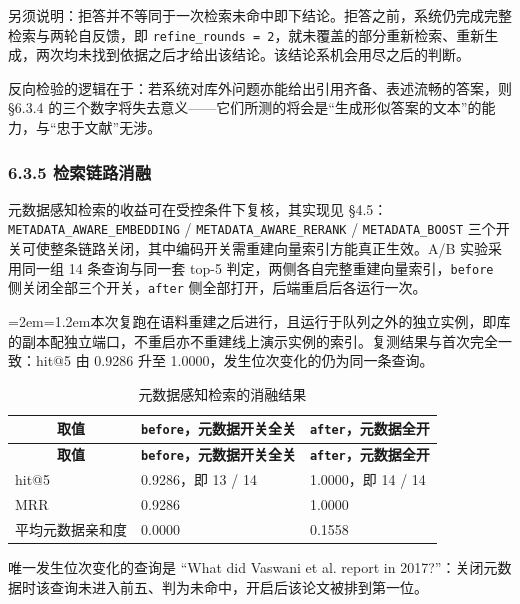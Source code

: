 \documentclass[UTF8,fontset=windows,zihao=5,a4paper]{ctexart}
\newenvironment{aside}{\par\vspace{3pt}\begingroup\zihao{5}%
  \leftskip=2em\rightskip=1.2em\noindent\ignorespaces}{\par\endgroup\vspace{3pt}}
\begin{document}
另须说明：拒答并不等同于一次检索未命中即下结论。拒答之前，系统仍完成完整检索与两轮自反馈，即 \texttt{refine\_\allowbreak{}rounds = 2}，就未覆盖的部分重新检索、重新生成，两次均未找到依据之后才给出该结论。该结论系机会用尽之后的判断。

反向检验的逻辑在于：若系统对库外问题亦能给出引用齐备、表述流畅的答案，则 §6.3.4 的三个数字将失去意义——它们所测的将会是“生成形似答案的文本”的能力，与“忠于文献”无涉。

\subsubsection*{6.3.5 检索链路消融}
元数据感知检索的收益可在受控条件下复核，其实现见 §4.5：\texttt{METADATA\_\allowbreak{}AWARE\_\allowbreak{}EMBEDDING} / \texttt{METADATA\_\allowbreak{}AWARE\_\allowbreak{}RERANK} / \texttt{METADATA\_\allowbreak{}BOOST} 三个开关可使整条链路关闭，其中编码开关需重建向量索引方能真正生效。A/B 实验采用同一组 14 条查询与同一套 top-5 判定，两侧各自完整重建向量索引，\texttt{before} 侧关闭全部三个开关，\texttt{after} 侧全部打开，后端重启后各运行一次。

\begin{aside}本次复跑在语料重建之后进行，且运行于队列之外的独立实例，即库的副本配独立端口，不重启亦不重建线上演示实例的索引。复测结果与首次完全一致：hit@5 由 0.9286 升至 1.0000，发生位次变化的仍为同一条查询。\end{aside}

\begin{longtable}{@{}p{}p{}p{}@{}}
\caption{元数据感知检索的消融结果}\\
\toprule
\multicolumn{1}{c}{\textbf{取值}} & \multicolumn{1}{c}{\textbf{\texttt{before}，元数据开关全关}} & \multicolumn{1}{c}{\textbf{\texttt{after}，元数据全开}} \\
\midrule
\endfirsthead
\toprule
\multicolumn{1}{c}{\textbf{取值}} & \multicolumn{1}{c}{\textbf{\texttt{before}，元数据开关全关}} & \multicolumn{1}{c}{\textbf{\texttt{after}，元数据全开}} \\
\midrule
\endhead
\bottomrule
\endfoot
hit@5 & 0.9286，即 13 / 14 & 1.0000，即 14 / 14 \\
MRR & 0.9286 & 1.0000 \\
平均元数据亲和度 & 0.0000 & 0.1558 \\
\end{longtable}

唯一发生位次变化的查询是 “What did Vaswani et al. report in 2017?”：关闭元数据时该查询未进入前五、判为未命中，开启后该论文被排到第一位。
\end{document}
